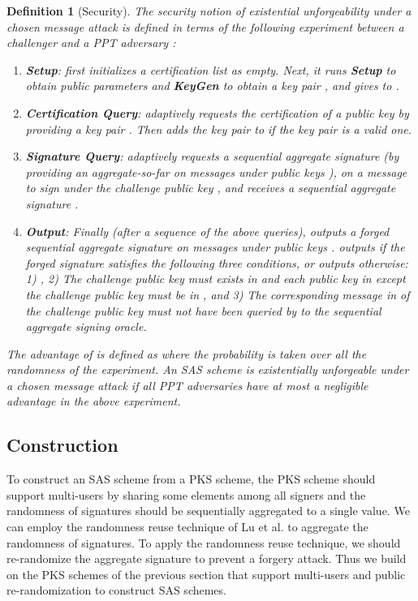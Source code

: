 \documentclass[11pt,letterpaper]{article}
\newtheorem{definition}[theorem]{Definition}
\newcommand{\tb}[1]{\textbf{#1}}
\begin{document}
\begin{definition}[Security]
The security notion of existential unforgeability under a chosen message
attack is defined in terms of the following experiment between a challenger
 and a PPT adversary :
\begin{enumerate}
\item \tb{Setup}:  first initializes a certification list  as
    empty. Next, it runs \tb{Setup} to obtain public parameters  and
    \tb{KeyGen} to obtain a key pair , and gives  to .

\item \tb{Certification Query}:  adaptively requests the
    certification of a public key by providing a key pair . Then
     adds the key pair  to  if the key pair is a valid
    one.

\item \tb{Signature Query}:  adaptively requests a sequential
    aggregate signature (by providing an aggregate-so-far  on messages
     under public keys ), on a message  to sign
    under the challenge public key , and receives a sequential
    aggregate signature .

\item \tb{Output}: Finally (after a sequence of the above queries),
     outputs a forged sequential aggregate signature  on
    messages  under public keys .  outputs
     if the forged signature satisfies the following three conditions,
    or outputs  otherwise: 1) , 2) The challenge public key  must exists in
     and each public key in  except the challenge
    public key must be in , and 3) The corresponding message  in
     of the challenge public key  must not have been
    queried by  to the sequential aggregate signing oracle.
\end{enumerate}
The advantage of  is defined as  where the probability is taken over all the randomness of the
experiment. An SAS scheme is existentially unforgeable under a chosen message
attack if all PPT adversaries have at most a negligible advantage in the
above experiment.
\end{definition}

\subsection{Construction}

To construct an SAS scheme from a PKS scheme, the PKS scheme should support
multi-users by sharing some elements among all signers and the randomness of
signatures should be sequentially aggregated to a single value. We can employ
the randomness reuse technique of Lu et al. \cite{LuOSSW06} to aggregate the
randomness of signatures. To apply the randomness reuse technique, we should
re-randomize the aggregate signature to prevent a forgery attack. Thus we
build on the PKS schemes of the previous section that support multi-users and
public re-randomization to construct SAS schemes.
\end{document}

